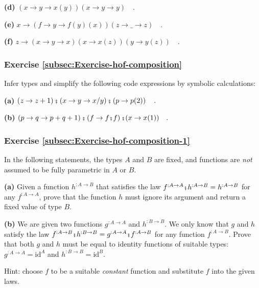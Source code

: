 \textbf{(d)} $\left(x\rightarrow y\rightarrow x(y)\right)\left(x\rightarrow y\rightarrow y\right)\quad.$

\textbf{(e)} $x\rightarrow\left(f\rightarrow y\rightarrow f(y)(x)\right)\left(z\rightarrow\_\rightarrow z\right)\quad.$

\textbf{(f)} $z\rightarrow\left(x\rightarrow y\rightarrow x\right)\left(x\rightarrow x(z)\right)(y\rightarrow y(z))\quad.$

\subsubsection{Exercise \label{subsec:Exercise-hof-composition}\ref{subsec:Exercise-hof-composition}}

Infer types and simplify the following code expressions by symbolic
calculations:

\textbf{(a)} $\left(z\rightarrow z+1\right)\bef\left(x\rightarrow y\rightarrow x/y\right)\bef\left(p\rightarrow p(2)\right)\quad.$

\textbf{(b)} $\left(p\rightarrow q\rightarrow p+q+1\right)\bef\left(f\rightarrow f\bef f\right)\bef(x\rightarrow x(1))\quad.$

\subsubsection{Exercise \label{subsec:Exercise-hof-composition-1}\ref{subsec:Exercise-hof-composition-1}}

In the following statements, the types $A$ and $B$ are fixed, and
functions are \emph{not} assumed to be fully parametric in $A$ or
$B$.

\textbf{(a)} Given a function $h^{:A\rightarrow B}$ that satisfies
the law $f^{:A\rightarrow A}\bef h^{:A\rightarrow B}=h^{:A\rightarrow B}$
for any $f^{:A\rightarrow A}$, prove that the function $h$ must
ignore its argument and return a fixed value of type $B$.

\textbf{(b)} We are given two functions $g^{:A\rightarrow A}$ and
$h^{:B\rightarrow B}$. We only know that $g$ and $h$ satisfy the
law $f^{:A\rightarrow B}\bef h^{:B\rightarrow B}=g^{:A\rightarrow A}\bef f^{:A\rightarrow B}$
for any function $f^{:A\rightarrow B}$. Prove that both $g$ and
$h$ must be equal to identity functions of suitable types: $g^{:A\rightarrow A}=\text{id}^{A}$
and $h^{:B\rightarrow B}=\text{id}^{B}$.

Hint: choose $f$ to be a suitable \emph{constant} function
and substitute $f$ into the given laws.

